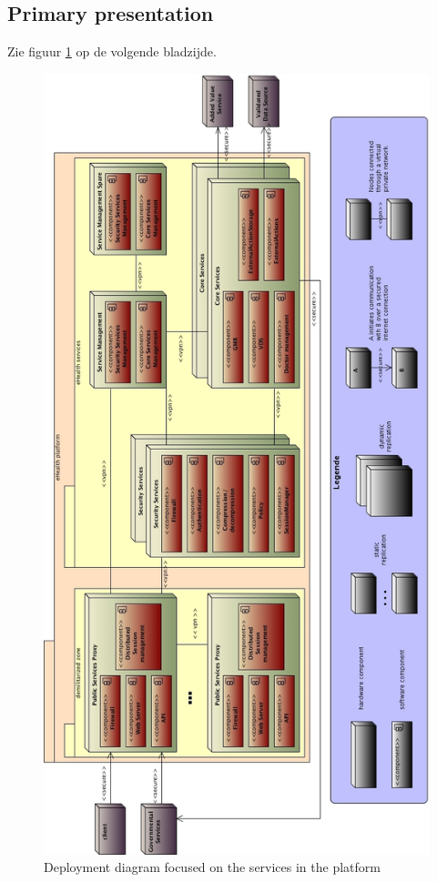 \documentclass[a4paper,10pt]{article}
\begin{document}
\subsection{Primary presentation}
Zie figuur \ref{fig:dep_services} op de volgende bladzijde.
\begin{center}
    \begin{figure}[!h]
	\label{fig:dep_services}
      \includegraphics[scale=0.47]{../images/deployment_services.jpg}
	\caption{Deployment diagram focused on the services in the platform}
    \end{figure}
  \end{center}
\end{document}
